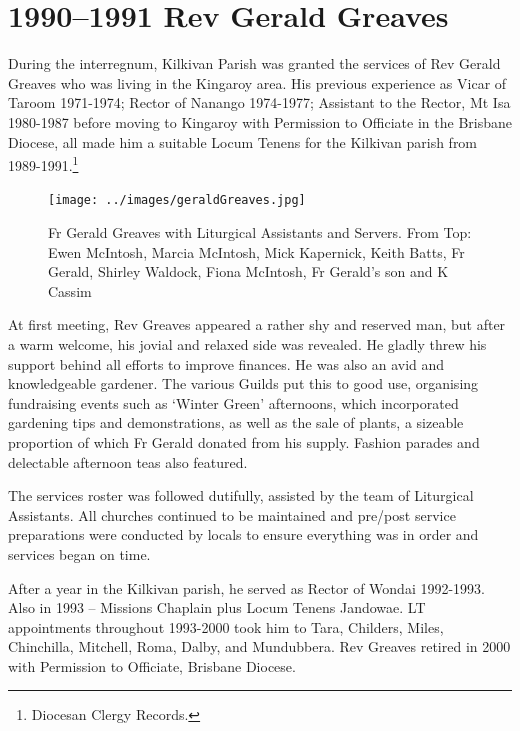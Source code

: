 \section{1990--1991 Rev Gerald Greaves}



During the interregnum, Kilkivan Parish was granted the services of Rev Gerald Greaves who was living in the Kingaroy area. His previous experience as Vicar of Taroom 1971-1974; Rector of Nanango 1974-1977; Assistant to the Rector, Mt Isa 1980-1987 before moving to Kingaroy with Permission to Officiate in the Brisbane Diocese, all made him a suitable Locum Tenens for the Kilkivan parish from 1989-1991.\footnote{Diocesan Clergy Records.}








\begin{figure}
\begin{center}
\texttt{[image: ../images/geraldGreaves.jpg]}
\caption{Fr Gerald Greaves with Liturgical Assistants and Servers. From Top: Ewen McIntosh, Marcia McIntosh, Mick Kapernick, Keith Batts, Fr Gerald, Shirley Waldock, Fiona McIntosh, Fr Gerald's son and K Cassim}
\end{center}
\end{figure}




At first meeting, Rev Greaves appeared a rather shy and reserved man, but after a warm welcome, his jovial and relaxed side was revealed. He gladly threw his support behind all efforts to improve finances. He was also an avid and knowledgeable gardener. The various Guilds put this to good use, organising fundraising events such as `Winter Green' afternoons, which incorporated gardening tips and demonstrations, as well as the sale of plants, a sizeable proportion of which Fr Gerald donated from his supply. Fashion parades and delectable afternoon teas also featured.



The services roster was followed dutifully, assisted by the team of Liturgical Assistants. All churches continued to be maintained and pre/post service preparations were conducted by locals to ensure everything was in order and services began on time.



After a year in the Kilkivan parish, he served as Rector of Wondai 1992-1993. Also in 1993 -- Missions Chaplain plus Locum Tenens Jandowae. LT appointments throughout 1993-2000 took him to Tara, Childers, Miles, Chinchilla, Mitchell, Roma, Dalby, and Mundubbera. Rev Greaves retired in 2000 with Permission to Officiate, Brisbane Diocese.



